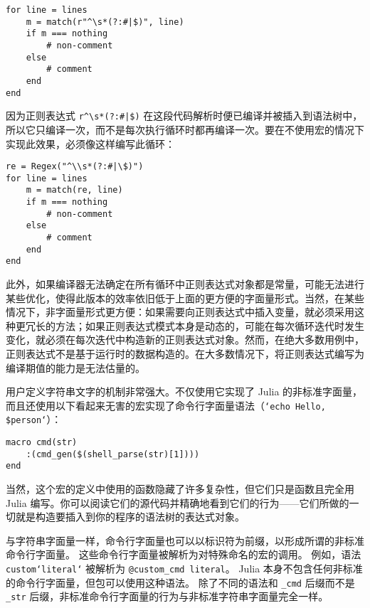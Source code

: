 \begin{verbatim}
for line = lines
    m = match(r"^\s*(?:#|$)", line)
    if m === nothing
        # non-comment
    else
        # comment
    end
end
\end{verbatim}



因为正则表达式 \texttt{r{\textquotedbl}{\textasciicircum}{\textbackslash}s*(?:\#|\$){\textquotedbl}} 在这段代码解析时便已编译并被插入到语法树中，所以它只编译一次，而不是每次执行循环时都再编译一次。要在不使用宏的情况下实现此效果，必须像这样编写此循环：




\begin{verbatim}
re = Regex("^\\s*(?:#|\$)")
for line = lines
    m = match(re, line)
    if m === nothing
        # non-comment
    else
        # comment
    end
end
\end{verbatim}



此外，如果编译器无法确定在所有循环中正则表达式对象都是常量，可能无法进行某些优化，使得此版本的效率依旧低于上面的更方便的字面量形式。当然，在某些情况下，非字面量形式更方便：如果需要向正则表达式中插入变量，就必须采用这种更冗长的方法；如果正则表达式模式本身是动态的，可能在每次循环迭代时发生变化，就必须在每次迭代中构造新的正则表达式对象。然而，在绝大多数用例中，正则表达式不是基于运行时的数据构造的。在大多数情况下，将正则表达式编写为编译期值的能力是无法估量的。



用户定义字符串文字的机制非常强大。不仅使用它实现了 Julia 的非标准字面量，而且还使用以下看起来无害的宏实现了命令行字面量语法（\texttt{`echo {\textquotedbl}Hello, \$person{\textquotedbl}`}）：




\begin{verbatim}
macro cmd(str)
    :(cmd_gen($(shell_parse(str)[1])))
end
\end{verbatim}



当然，这个宏的定义中使用的函数隐藏了许多复杂性，但它们只是函数且完全用 Julia 编写。你可以阅读它们的源代码并精确地看到它们的行为——它们所做的一切就是构造要插入到你的程序的语法树的表达式对象。



与字符串字面量一样，命令行字面量也可以以标识符为前缀，以形成所谓的非标准命令行字面量。 这些命令行字面量被解析为对特殊命名的宏的调用。 例如，语法 \texttt{custom`literal`} 被解析为 \texttt{@custom\_cmd {\textquotedbl}literal{\textquotedbl}}。 Julia 本身不包含任何非标准的命令行字面量，但包可以使用这种语法。 除了不同的语法和 \texttt{\_cmd} 后缀而不是 \texttt{\_str} 后缀，非标准命令行字面量的行为与非标准字符串字面量完全一样。



